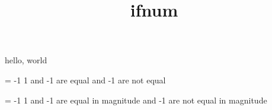 \documentclass{amsart}
\title{ifnum}
\begin{document}
\maketitle

hello, world

 = -1
    1 and -1 are equal
 and -1 are not equal
\fi

 = -1
    1 and -1 are equal in magnitude
 and -1 are not equal in magnitude
\fi
\end{document}
